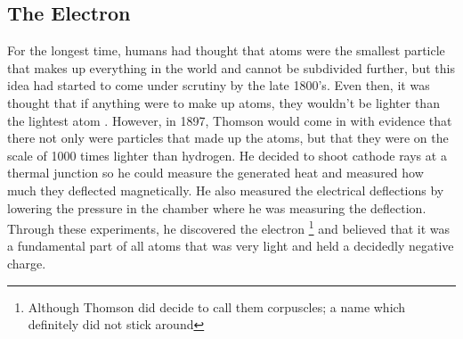 \subsection{The Electron}

For the longest time, humans had thought that atoms were the smallest particle that makes up everything in the world and cannot be subdivided further\cite{Dalton}, but this idea had started to come under scrutiny by the late 1800's\cite{Pullman}.
Even then, it was thought that if anything were to make up atoms, they wouldn't be lighter than the lightest atom \cite{Thorpe}.
However, in 1897, Thomson would come in with evidence that there not only were particles that made up the atoms, but that they were on the scale of 1000 times lighter than hydrogen\cite{Thomson_1907}.
He decided to shoot cathode rays at a thermal junction so he could measure the generated heat and measured how much they deflected magnetically.
He also measured the electrical deflections by lowering the pressure in the chamber where he was measuring the deflection\cite{Thomson}.
Through these experiments, he discovered the electron
\footnote{Although Thomson did decide to call them corpuscles; a name which definitely did not stick around}
and believed that it was a fundamental part of all atoms that was very light and held a decidedly negative charge\cite{electronDiscovery}.

